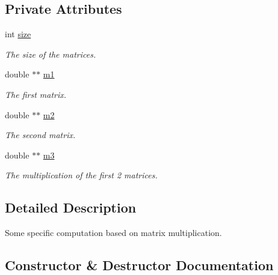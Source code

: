\subsection*{Private Attributes}
\begin{DoxyCompactItemize}
\item 
int \hyperlink{classMatrix__computation__no__eigen_a1f73cf9e7670c6a78a64cb8977f2dcc6}{size}
\begin{DoxyCompactList}\small\item\em The size of the matrices. \end{DoxyCompactList}\item 
double $\ast$$\ast$ \hyperlink{classMatrix__computation__no__eigen_a66d9dde3f7fc191c8be8b23a1c7764e2}{m1}
\begin{DoxyCompactList}\small\item\em The first matrix. \end{DoxyCompactList}\item 
double $\ast$$\ast$ \hyperlink{classMatrix__computation__no__eigen_a4cda5f8f06be2a85621b1ce1eca7cded}{m2}
\begin{DoxyCompactList}\small\item\em The second matrix. \end{DoxyCompactList}\item 
double $\ast$$\ast$ \hyperlink{classMatrix__computation__no__eigen_a54b2738e77b3282368ac2c7fd184d2a3}{m3}
\begin{DoxyCompactList}\small\item\em The multiplication of the first 2 matrices. \end{DoxyCompactList}\end{DoxyCompactItemize}


\subsection{Detailed Description}
Some specific computation based on matrix multiplication. 

\subsection{Constructor \& Destructor Documentation}
